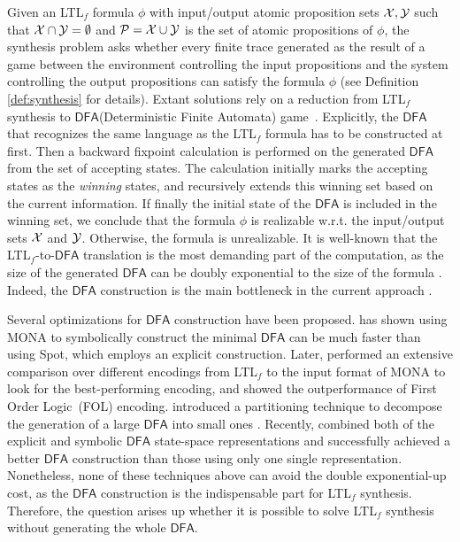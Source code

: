 \documentclass[letterpaper]{article} %
\newcommand{\ltlf}{\textsf{LTL}$_f$\xspace}
\def\dfa{$\mathsf{DFA}$\xspace}
\newcommand{\mona}{{\sf MONA}\xspace}
\newcommand{\spot}{{\sf Spot}\xspace}
\begin{document}
Given an \ltlf formula $\phi$ with input/output atomic proposition sets $\mathcal{X},\mathcal{Y}$ such that $\mathcal{X}\cap \mathcal{Y}=\emptyset$ and $\mathcal{P}=\mathcal{X}\cup\mathcal{Y}$ is the set of atomic propositions of $\phi$, the synthesis problem asks whether every finite trace generated as the result of a game between the environment controlling the input propositions and the system controlling the output propositions can satisfy the formula $\phi$ (see Definition \ref{def:synthesis} for details). Extant solutions rely on a reduction from \ltlf synthesis to \dfa (Deterministic Finite Automata) game~\citep{GV15}. Explicitly, the \dfa that recognizes the same language as the \ltlf formula has to be constructed at first. Then a backward fixpoint calculation is performed on the generated \dfa from the set of accepting states. The calculation initially marks the accepting states as the \emph{winning} states, and recursively extends this winning set based on the current information. If finally the initial state of the \dfa is included in the winning set, we conclude that the formula $\phi$ is realizable w.r.t. the input/output sets $\mathcal{X}$ and $\mathcal{Y}$. Otherwise, the formula is unrealizable. It is well-known that the \ltlf-to-\dfa translation is the most demanding part of the computation, as the size of the generated \dfa can be doubly exponential to the size of the formula \citep{KV01d}. Indeed, the \dfa construction is the main bottleneck in the current approach \cite{ZTLPV17}.

Several optimizations for \dfa construction have been proposed. \citep{ZTLPV17} has shown using \mona \citep{HJJKPRS95,EKM98} to symbolically construct the minimal \dfa can be much faster than using \spot \citep{DP04}, which employs an explicit construction. Later, \citep{ZhuPV19} performed an extensive comparison over different encodings from \ltlf to the input format of \mona to look for the best-performing encoding, and showed the outperformance of First Order Logic~(FOL) encoding. \citep{TV19} introduced a partitioning technique to decompose the generation of a large \dfa into small ones \citep{MSL18}. Recently, \citep{BLTV20} combined both of the explicit and symbolic \dfa state-space representations and successfully achieved a better \dfa construction than those using only one single representation. Nonetheless, none of these techniques above can avoid the double exponential-up cost, as the \dfa construction is the indispensable part for \ltlf synthesis. Therefore, the question arises up whether it is possible to solve \ltlf synthesis without generating the whole \dfa.
\end{document}
